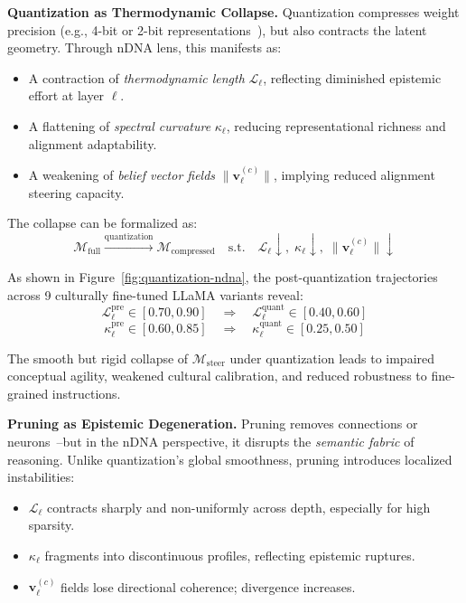 \textbf{Quantization as Thermodynamic Collapse.} Quantization compresses weight precision (e.g., 4-bit or 2-bit representations~\cite{frantar2023gptq, dettmers2023qlora}), but also contracts the latent geometry. Through nDNA lens, this manifests as:

\begin{itemize}[leftmargin=1.5em]
    \item A contraction of \emph{thermodynamic length} $\mathcal{L}_\ell$, reflecting diminished epistemic effort at layer $\ell$.
    \item A flattening of \emph{spectral curvature} $\kappa_\ell$, reducing representational richness and alignment adaptability.
    \item A weakening of \emph{belief vector fields} $\|\mathbf{v}_\ell^{(c)}\|$, implying reduced alignment steering capacity.
\end{itemize}

\vspace{0.5em}
\noindent The collapse can be formalized as:
\[\boxed{
\mathcal{M}_{\text{full}} \xrightarrow{\text{quantization}} \mathcal{M}_{\text{compressed}} \quad \text{s.t.} \quad \mathcal{L}_\ell \downarrow,\; \kappa_\ell \downarrow,\; \|\mathbf{v}_\ell^{(c)}\| \downarrow
}
\]

\vspace{0.5em}
\noindent As shown in Figure~\ref{fig:quantization-ndna}, the post-quantization trajectories across 9 culturally fine-tuned LLaMA variants reveal:
\[
\mathcal{L}_\ell^{\text{pre}} \in [0.70, 0.90] \quad \Rightarrow \quad \mathcal{L}_\ell^{\text{quant}} \in [0.40, 0.60]
\]
\[
\kappa_\ell^{\text{pre}} \in [0.60, 0.85] \quad \Rightarrow \quad \kappa_\ell^{\text{quant}} \in [0.25, 0.50]
\]

\noindent The smooth but rigid collapse of $\mathcal{M}_{\text{steer}}$ under quantization leads to impaired conceptual agility, weakened cultural calibration, and reduced robustness to fine-grained instructions.

\vspace{1em}
\noindent\textbf{Pruning as Epistemic Degeneration.} Pruning removes connections or neurons~\cite{han2015deep, gale2019state}--but in the nDNA perspective, it disrupts the \emph{semantic fabric} of reasoning. Unlike quantization's global smoothness, pruning introduces localized instabilities:

\begin{itemize}[leftmargin=1.5em]
    \item $\mathcal{L}_\ell$ contracts sharply and non-uniformly across depth, especially for high sparsity.
    \item $\kappa_\ell$ fragments into discontinuous profiles, reflecting epistemic ruptures.
    \item $\mathbf{v}_\ell^{(c)}$ fields lose directional coherence; divergence increases.
\end{itemize}

